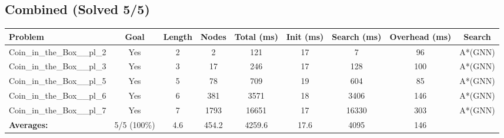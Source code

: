 \documentclass{article}
\begin{document}
\subsection*{Combined (Solved 5/5)}
\begin{tabular}{lcccccccc}
\toprule
Problem & Goal & Length & Nodes & Total (ms) & Init (ms) & Search (ms) & Overhead (ms) & Search \\
\midrule
Coin\_in\_the\_Box\_\_pl\_2 & Yes & 2 & 2 & 121 & 17 & 7 & 96 & A*(GNN) \\
Coin\_in\_the\_Box\_\_pl\_3 & Yes & 3 & 17 & 246 & 17 & 128 & 100 & A*(GNN) \\
Coin\_in\_the\_Box\_\_pl\_5 & Yes & 5 & 78 & 709 & 19 & 604 & 85 & A*(GNN) \\
Coin\_in\_the\_Box\_\_pl\_6 & Yes & 6 & 381 & 3571 & 18 & 3406 & 146 & A*(GNN) \\
Coin\_in\_the\_Box\_\_pl\_7 & Yes & 7 & 1793 & 16651 & 17 & 16330 & 303 & A*(GNN) \\
\textbf{Averages:} & 5/5 (100\%) & 4.6 & 454.2 & 4259.6 & 17.6 & 4095 & 146 & \\
\bottomrule
\end{tabular}
\\[0.7cm]
\end{document}
